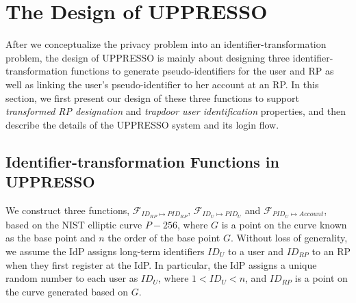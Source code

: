 \section{The Design of UPPRESSO}
\label{sec:UPPRESSO}

After we conceptualize the privacy problem into an identifier-transformation problem, the design of UPPRESSO is mainly about designing three identifier-transformation functions to generate pseudo-identifiers for the user and RP as well as linking the user's pseudo-identifier to her account at an RP. In this section, we first present our design of these three functions to support {\em transformed RP designation} and {\em trapdoor user identification} properties, and then describe the details of the UPPRESSO system and its login flow.


\subsection{Identifier-transformation Functions in UPPRESSO}
\label{subsec:overview}


We construct three functions, $\mathcal{F}_{ID_{RP} \mapsto PID_{RP}}$, $\mathcal{F}_{ID_{U} \mapsto PID_{U}}$ and $\mathcal{F}_{PID_{U} \mapsto Account}$, based on the NIST elliptic curve $P-256$, 
where 
$G$ is a point on the curve known as the base point 
and $n$ the order of the base point $G$. %
Without loss of generality, we assume the IdP assigns long-term identifiers $ID_U$ to a user and $ID_{RP}$ to an RP when they first register at the IdP. In particular, the IdP assigns a unique random number to each user as $ID_U$, where $1<ID_U<n$, and $ID_{RP}$ is a point on the curve generated based on $G$.%

